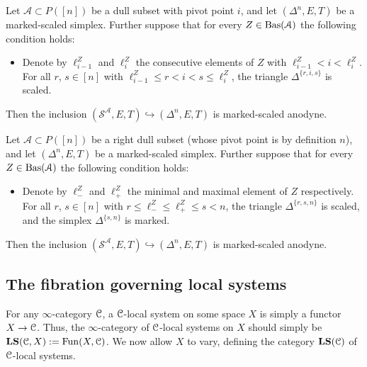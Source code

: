\documentclass[main.tex]{subfiles}
\begin{document}
\begin{lemma}
  \label{lemma:pivot_trick}
  Let $\mathcal{A} \subset P([n])$ be a dull subset with pivot point $i$, and let $(\Delta^{n}, E, T)$ be a marked-scaled simplex. Further suppose that for every $Z \in \mathrm{Bas}(\mathcal{A})$ the following condition holds:
  \begin{itemize}
    \item Denote by $\ell^{Z}_{i-1}$ and $\ell^{Z}_{i}$ the consecutive elements of $Z$ with $\ell^{Z}_{i-1} < i < \ell^{Z}_{i}$. For all $r$, $s \in [n]$ with $\ell^{Z}_{i-1} \leq r < i < s \leq \ell^{Z}_{i}$, the triangle $\Delta^{\{r, i, s\}}$ is scaled.
  \end{itemize}

  Then the inclusion $(\mathcal{S}^{\mathcal{A}}, E, T) \hookrightarrow (\Delta^{n}, E, T)$ is marked-scaled anodyne.
\end{lemma}

\begin{lemma}
  \label{lemma:right-anodyne_pivot_trick}
  Let $\mathcal{A} \subset P([n])$ be a right dull subset (whose pivot point is by definition $n$), and let $(\Delta^{n}, E, T)$ be a marked-scaled simplex. Further suppose that for every $Z \in \mathrm{Bas}(\mathcal{A})$ the following condition holds:
  \begin{itemize}
    \item Denote by $\ell^{Z}_{-}$ and $\ell^{Z}_{+}$ the minimal and maximal element of $Z$ respectively. For all $r$, $s \in [n]$ with $r \leq \ell^{Z}_{-} \leq \ell^{Z}_{+} \leq s < n$, the triangle $\Delta^{\{r, s, n\}}$ is scaled, and the simplex $\Delta^{\{s, n\}}$ is marked.
  \end{itemize}

  Then the inclusion $(\mathcal{S}^{\mathcal{A}}, E, T) \hookrightarrow (\Delta^{n}, E, T)$ is marked-scaled anodyne.
\end{lemma}


\subsection{The fibration governing local systems}
\label{ssc:the_fibration}

For any $\infty$-category $\mathcal{C}$, a $\mathcal{C}$-local system on some space $X$ is simply a functor $X \to \mathcal{C}$. Thus, the $\infty$-category of $\mathcal{C}$-local systems on $X$ should simply be $\mathbf{LS}(\mathcal{C}, X):=\mathrm{Fun}(X, \mathcal{C})$. We now allow $X$ to vary, defining the category $\mathbf{LS}(\mathcal{C})$ of $\mathcal{C}$-local systems.
\end{document}
